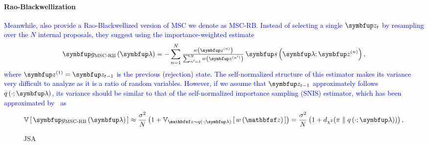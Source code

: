 \paragraph{Rao-Blackwellization}
\textcolor{blue}{
Meanwhile, \citeauthor{NEURIPS2020_b2070693} also provide a Rao-Blackwellized version of MSC we denote as MSC-RB.
Instead of selecting a single \(\vz_t\) by resampling over the \(N\) internal proposals, they suggest using the importance-weighted estimate%
}
{
\begin{align*}
        \vg_{\text{MSC-RB}}\left(\vlambda\right) = - \sum^{N}_{n=1} {
        \textstyle
\frac{w\left(\vz^{(n)}\right)}{ \sum^{N}_{n^{\prime}=1} w\left(\vz^{(n^{\prime})}\right)}
} \, \vs\left(\vlambda;\vz^{(n)}\right),
\end{align*}%
}%
\textcolor{blue}{
where \(\vz^{(1)} = \vz_{t-1}\) is the previous (rejection) state.
The self-normalized structure of this estimator makes its variance very difficult to analyze as it is a ratio of random variables.
However, if we assume that \(\vz_{t-1}\) approximately follows \(q\left(\cdot; \vlambda\right)\), its variance should be similar to that of the self-normalized importance sampling (SNIS) estimator, which has been approximated by~\citet{kong_note_1992, kong_sequential_1994, elvira_rethinking_2022} as%
}
\begin{align}
\V{ \vg_{\text{MSC-RB}}\left(\vlambda\right) } \approx
\frac{
    \sigma^2
}{
    N
}
\left(1 + \Vsub{\rvvz \sim q\left(\cdot; \vlambda\right)}{ w\left(\rvvz\right) }\right)
=
\frac{
    \sigma^2
}{
    N
}
\left( 1 + \DChi{\pi}{q\left(\cdot; \vlambda\right)} \right),\label{eq:snis_var}
\end{align}
%
\begin{wrapfigure}[17]{r}{0.37\textwidth}
  \vspace{-3ex}
  \begin{minipage}[c]{0.37\textwidth}
    \begin{algorithm2e}[H]
      \DontPrintSemicolon
      \SetAlgoLined
      \caption{JSA}\label{alg:jsa}
    \end{algorithm2e}
  \end{minipage}
\end{wrapfigure}

